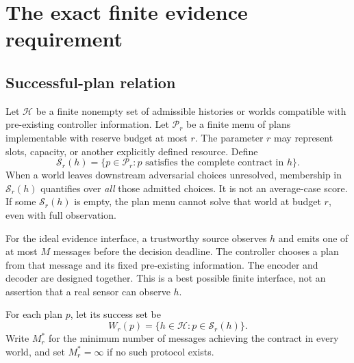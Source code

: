 \documentclass[11pt,a4paper]{article}
\theoremstyle{definition}\newtheorem{definition}{Definition}
\newcommand{\Hist}{\mathcal H}
\newcommand{\Plans}{\mathcal P}
\newcommand{\Succ}{\mathcal S}
\begin{document}
\section{The exact finite evidence requirement}
\label{sec:cover}
\subsection{Successful-plan relation}
Let $\Hist$ be a finite nonempty set of admissible histories or worlds compatible with pre-existing controller information. Let $\Plans_r$ be a finite menu of plans implementable with reserve budget at most $r$. The parameter $r$ may represent slots, capacity, or another explicitly defined resource. Define
\begin{equation}
\Succ_r(h)=\{p\in\Plans_r:p\text{ satisfies the complete contract in }h\}.
\label{eq:success}
\end{equation}
When a world leaves downstream adversarial choices unresolved, membership in $\Succ_r(h)$ quantifies over \emph{all} those admitted choices. It is not an average-case score. If some $\Succ_r(h)$ is empty, the plan menu cannot solve that world at budget $r$, even with full observation.

For the ideal evidence interface, a trustworthy source observes $h$ and emits one of at most $M$ messages before the decision deadline. The controller chooses a plan from that message and its fixed pre-existing information. The encoder and decoder are designed together. This is a best possible finite interface, not an assertion that a real sensor can observe $h$.

For each plan $p$, let its success set be
\begin{equation}
W_r(p)=\{h\in\Hist:p\in\Succ_r(h)\}.
\end{equation}
Write $M_r^*$ for the minimum number of messages achieving the contract in every world, and set $M_r^*=\infty$ if no such protocol exists.
\end{document}
